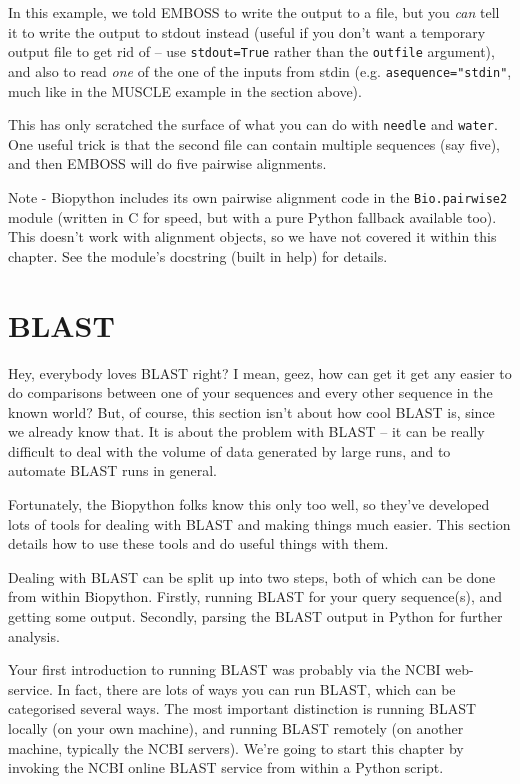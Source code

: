 \documentclass{report}
\begin{document}
In this example, we told EMBOSS to write the output to a file, but you
\emph{can} tell it to write the output to stdout instead (useful if you
don't want a temporary output file to get rid of -- use
\texttt{stdout=True} rather than the \texttt{outfile} argument), and
also to read \emph{one} of the one of the inputs from stdin (e.g.
\texttt{asequence="stdin"}, much like in the MUSCLE example in the
section above).

This has only scratched the surface of what you can do with \texttt{needle}
and \texttt{water}. One useful trick is that the second file can contain
multiple sequences (say five), and then EMBOSS will do five pairwise
alignments.

Note - Biopython includes its own pairwise alignment code in the \verb|Bio.pairwise2|
module (written in C for speed, but with a pure Python fallback available too). This
doesn't work with alignment objects, so we have not covered it within this chapter.
See the module's docstring (built in help) for details.

\chapter{BLAST}
\label{chapter:blast}
Hey, everybody loves BLAST right? I mean, geez, how can get it get any easier to do comparisons between one of your sequences and every other sequence in the known world? But, of course, this section isn't about how cool BLAST is, since we already know that. It is about the problem with BLAST -- it can be really difficult to deal with the volume of data generated by large runs, and to automate BLAST runs in general.

Fortunately, the Biopython folks know this only too well, so they've developed lots of tools for dealing with BLAST and making things much easier. This section details how to use these tools and do useful things with them.

Dealing with BLAST can be split up into two steps, both of which can be done from within Biopython.
Firstly, running BLAST for your query sequence(s), and getting some output.
Secondly, parsing the BLAST output in Python for further analysis.

Your first introduction to running BLAST was probably via the NCBI web-service.
In fact, there are lots of ways you can run BLAST, which can be categorised several ways.
The most important distinction is running BLAST locally (on your own machine),
and running BLAST remotely (on another machine, typically the NCBI servers).
We're going to start this chapter by invoking the NCBI online BLAST service
from within a Python script.
\end{document}

